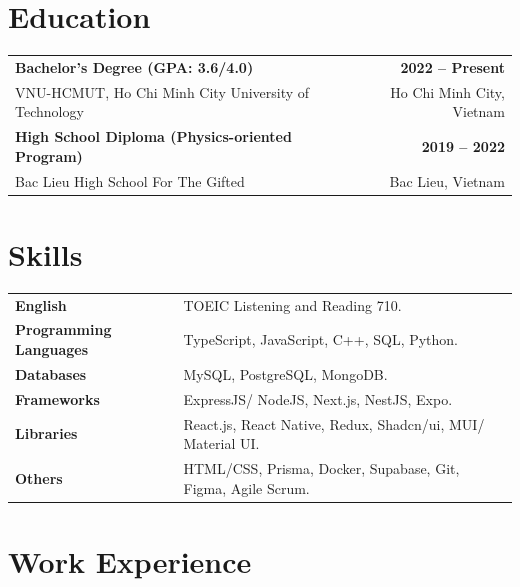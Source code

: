 \documentclass[a4paper,12pt]{article}
\begin{document}
\section{Education}
\begin{tabularx}{\linewidth}{@{}X r@{}}
\textbf{Bachelor's Degree (GPA: 3.6/4.0)} & \textbf{2022 -- Present} \\
VNU-HCMUT, Ho Chi Minh City University of Technology  & Ho Chi Minh City, Vietnam \\[6pt]
\textbf{High School Diploma (Physics-oriented Program)} & \textbf{2019 -- 2022} \\
Bac Lieu High School For The Gifted & Bac Lieu, Vietnam \\
\end{tabularx}

\section{Skills}
\begin{tabularx}{\linewidth}{@{}l X@{}}
\textbf{English} &  \normalsize{TOEIC Listening and Reading 710.} \vspace{0.1cm} \\
\textbf{Programming Languages}  &  \normalsize{TypeScript, JavaScript, C++, SQL, Python.} \vspace{0.1cm} \\
\textbf{Databases}  &  \normalsize{MySQL, PostgreSQL, MongoDB.} \vspace{0.1cm} \\
\textbf{Frameworks} &  \normalsize{ExpressJS/ NodeJS, Next.js, NestJS, Expo.} \vspace{0.1cm} \\
\textbf{Libraries} &  \normalsize{React.js, React Native, Redux, Shadcn/ui, MUI/ Material UI.} \vspace{0.1cm} \\
\textbf{Others} &  \normalsize{HTML/CSS, Prisma, Docker, Supabase, Git, Figma, Agile Scrum.}\\
\end{tabularx}

\section{Work Experience}
\end{document}
